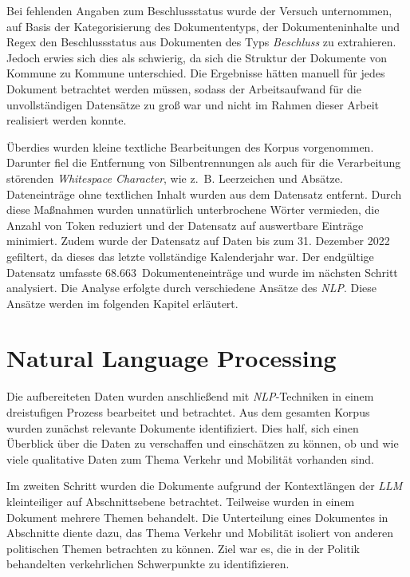 Bei fehlenden Angaben zum Beschlussstatus wurde der Versuch unternommen, auf Basis der Kategorisierung des Dokumententyps, der Dokumenteninhalte und Regex den Beschlussstatus aus Dokumenten des Typs \textit{Beschluss} zu extrahieren. Jedoch erwies sich dies als schwierig, da sich die Struktur der Dokumente von Kommune zu Kommune unterschied. Die Ergebnisse hätten manuell für jedes Dokument betrachtet werden müssen, sodass der Arbeitsaufwand für die unvollständigen Datensätze zu groß war und nicht im Rahmen dieser Arbeit realisiert werden konnte.

Überdies wurden kleine textliche Bearbeitungen des Korpus vorgenommen. Darunter fiel die Entfernung von Silbentrennungen als auch für die Verarbeitung störenden \textit{Whitespace Character}, wie z.~B. Leerzeichen und Absätze. Dateneinträge ohne textlichen Inhalt wurden aus dem Datensatz entfernt. Durch diese Maßnahmen wurden unnatürlich unterbrochene Wörter vermieden, die Anzahl von Token reduziert und der Datensatz auf auswertbare Einträge minimiert. Zudem wurde der Datensatz auf Daten bis zum 31. Dezember 2022 gefiltert, da dieses das letzte vollständige Kalenderjahr war. Der endgültige Datensatz umfasste 68.663~Dokumenteneinträge und wurde im nächsten Schritt analysiert. Die Analyse erfolgte durch verschiedene Ansätze des \textit{NLP}. Diese Ansätze werden im folgenden Kapitel erläutert.


\section{Natural Language Processing}\label{sec:methodik_nlp}

Die aufbereiteten Daten wurden anschließend mit \textit{NLP}-Techniken in einem dreistufigen Prozess bearbeitet und betrachtet. Aus dem gesamten Korpus wurden zunächst relevante Dokumente identifiziert. Dies half, sich einen Überblick über die Daten zu verschaffen und einschätzen zu können, ob und wie viele qualitative Daten zum Thema Verkehr und Mobilität vorhanden sind.

Im zweiten Schritt wurden die Dokumente aufgrund der Kontextlängen der \textit{LLM} kleinteiliger auf Abschnittsebene betrachtet. Teilweise wurden in einem Dokument mehrere Themen behandelt. Die Unterteilung eines Dokumentes in Abschnitte diente dazu, das Thema Verkehr und Mobilität isoliert von anderen politischen Themen betrachten zu können. Ziel war es, die in der Politik behandelten verkehrlichen Schwerpunkte zu identifizieren.

